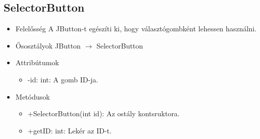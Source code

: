 \subsection{SelectorButton}
\begin{itemize}
	\item Felelősség\newline
	A JButton-t egészíti ki, hogy választógombként lehessen használni.
	\item Ősosztályok\newline
		JButton $\rightarrow$ SelectorButton
	\item Attribútumok\newline
	\begin{itemize}
		\item -id: int: A gomb ID-ja.
	\end{itemize}
	\item Metódusok\newline
	\begin{itemize}
		\item +SelectorButton(int id): Az ostály kontsruktora.
		\item +getID: int: Lekér az ID-t.
	\end{itemize}
\end{itemize}

